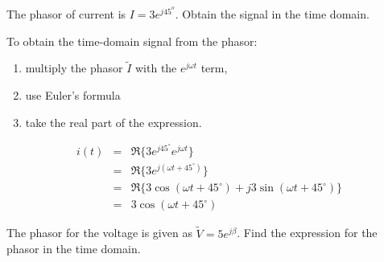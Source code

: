 \documentclass{ximera}
\begin{document}
\begin{example}
The phasor of current is  $I=3 e^{j 45^o}$. Obtain the signal in the time domain.


\begin{explanation}
  To obtain the time-domain signal from the phasor:
\begin{enumerate}
\item multiply the phasor $\tilde{I}$ with the $ e^{j\omega t}$ term, 
\item use Euler's formula 
\item take the real part of the expression.
\end{enumerate}  
   


\begin{eqnarray}
i(t)
&=& \Re\{3e^{j45^\circ}e^{j\omega t}\} \nonumber \\
&=& \Re\{3e^{j(\omega t+45^\circ)}\} \nonumber \\
&=& \Re\{3\cos(\omega t+45^\circ)
+j3\sin(\omega t+45^\circ)\} \nonumber \\
&=& 3\cos(\omega t+45^\circ) \label{phtotd}
\end{eqnarray}


\end{explanation}


\end{example}


\begin{question}
The phasor for the voltage is given as $\tilde{V}= 5 e^{ j \beta } $. Find the expression for the phasor in the time domain.
\begin{multipleChoice}  
\end{multipleChoice} 
\end{question}
\end{document}
